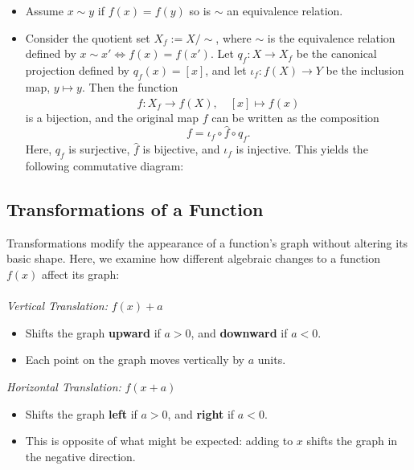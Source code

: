 \begin{itemize}[label =\(-\)]

	\item Assume \(x \sim y \) if \(f(x)= f(y)\) so is \(\sim\) an equivalence relation.

	\item Consider the quotient set \( X_f := X/\sim \), where \( \sim \) is the equivalence relation defined by \( x \sim x' \iff f(x) = f(x') \). Let \( q_f : X \to X_f \) be the canonical projection defined by \( q_f(x) = [x] \), and let \( \iota_f : f(X) \to Y \) be the inclusion map, \( y \mapsto y \). Then the function
	      \[
		      \hat{f} : X_f \to f(X), \quad [x] \mapsto f(x)
	      \]
	      is a bijection, and the original map \( f \) can be written as the composition
	      \[
		      f = \iota_f \circ \hat{f} \circ q_f.
	      \]
	      Here, \( q_f \) is surjective, \( \hat{f} \) is bijective, and \( \iota_f \) is injective. This yields the following commutative diagram:
	      \begin{center}
	      \end{center}

\end{itemize}

\subsection{Transformations of a Function}

Transformations modify the appearance of a function's graph without altering its basic shape.
Here, we examine how different algebraic changes to a function \( f(x) \) affect its graph:
\\\\
	 \emph{Vertical Translation:} \( f(x) + a \)
	      \begin{itemize}[label=\(-\)]
		      \item Shifts the graph \textbf{upward} if \( a > 0 \), and \textbf{downward} if \( a < 0 \).
		      \item Each point on the graph moves vertically by \( a \) units.
	      \end{itemize}

	\emph{Horizontal Translation:} \( f(x + a) \)
	      \begin{itemize}[label=\(-\)]
		      \item Shifts the graph \textbf{left} if \( a > 0 \), and \textbf{right} if \( a < 0 \).
		      \item This is opposite of what might be expected: adding to \( x \) shifts the graph in the negative direction.
	      \end{itemize}

